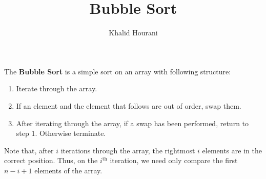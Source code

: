 \documentclass[a4paper]{article}
\title{Bubble Sort}
\author{Khalid Hourani}
\begin{document}
\maketitle

The \textbf{Bubble Sort} is a simple sort on an array with following structure:
\begin{enumerate}
\item Iterate through the array.
\item If an element and the element that follows are out of order, swap them.
\item After iterating through the array, if a swap has been performed, return to step 1. Otherwise terminate.
\end{enumerate}

Note that, after $i$ iterations through the array, the rightmost $i$ elements are in the correct position. Thus, on the $i^{\text{th}}$ iteration, we need only compare the first $n - i + 1$ elements of the array. 
\end{document}

